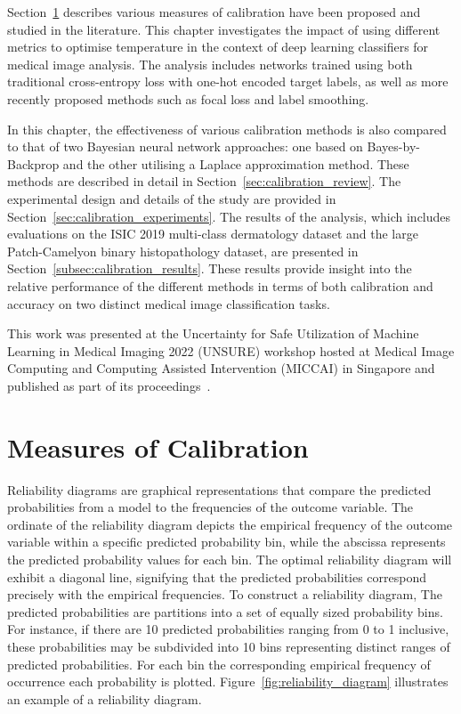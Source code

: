 Section~\ref{sec:calibration_measures} describes various measures of calibration have been proposed and studied in the literature. This chapter investigates the impact of using different metrics to optimise temperature in the context of deep learning classifiers for medical image analysis. The analysis includes networks trained using both traditional cross-entropy loss with one-hot encoded target labels, as well as more recently proposed methods such as focal loss and label smoothing.

In this chapter, the effectiveness of various calibration methods is also compared to that of two Bayesian neural network approaches: one based on Bayes-by-Backprop and the other utilising a Laplace approximation method. These methods are described in detail in Section~\ref{sec:calibration_review}. The experimental design and details of the study are provided in Section~\ref{sec:calibration_experiments}. The results of the analysis, which includes evaluations on the ISIC 2019 multi-class dermatology dataset and the large Patch-Camelyon binary histopathology dataset, are presented in Section~\ref{subsec:calibration_results}. These results provide insight into the relative performance of the different methods in terms of both calibration and accuracy on two distinct medical image classification tasks.

This work was presented at the Uncertainty for Safe Utilization of Machine Learning in Medical Imaging 2022 (UNSURE) workshop hosted at Medical Image Computing and Computing Assisted Intervention (MICCAI) in Singapore and published as part of its proceedings~\citep{carse2022calibration}.



\section{Measures of Calibration}
\label{sec:calibration_measures}
Reliability diagrams are graphical representations that compare the predicted probabilities from a model to the frequencies of the outcome variable. The ordinate of the reliability diagram depicts the empirical frequency of the outcome variable within a specific predicted probability bin, while the abscissa represents the predicted probability values for each bin. The optimal reliability diagram will exhibit a diagonal line, signifying that the predicted probabilities correspond precisely with the empirical frequencies. To construct a reliability diagram, The predicted probabilities are partitions into a set of equally sized probability bins. For instance, if there are 10 predicted probabilities ranging from 0 to 1 inclusive, these probabilities may be subdivided into 10 bins representing distinct ranges of predicted probabilities. For each bin the corresponding empirical frequency of occurrence each probability is plotted. Figure~\ref{fig:reliability_diagram} illustrates an example of a reliability diagram.

